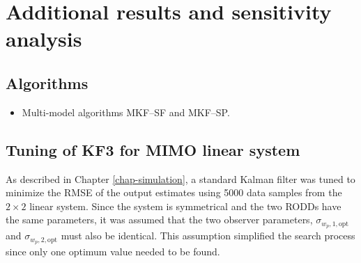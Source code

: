 \chapter{Additional results and sensitivity analysis}     %
\label{chap-Annex}                   %

\section{Algorithms} \label{section:annex-alg-KF}

\begin{itemize}
	\item Multi-model algorithms MKF--SF and MKF--SP.
\end{itemize}

\section{Tuning of KF3 for MIMO linear system} \label{section:annex-sim-2-KF-tuning}

As described in Chapter \ref{chap-simulation}, a standard Kalman filter was tuned to minimize the \gls{RMSE} of the output estimates using 5000 data samples from the $2\times2$ linear system. Since the system is symmetrical and the two \gls{RODD}s have the same parameters, it was assumed that the two observer parameters, $\sigma_{w_p,1,\text{opt}}$ and $\sigma_{w_p,2,\text{opt}}$ must also be identical. This assumption simplified the search process since only one optimum value needed to be found.

